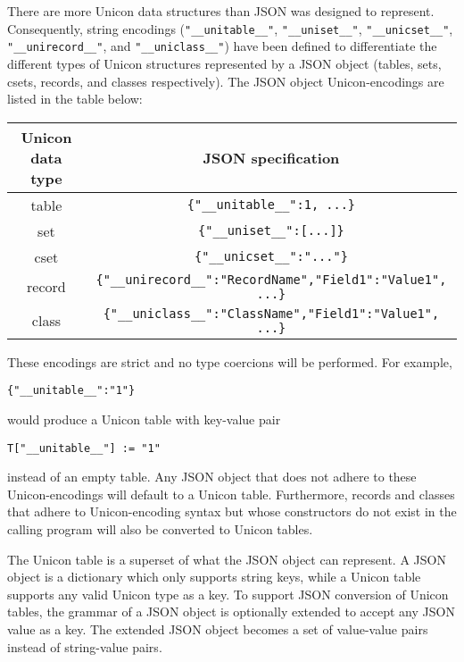 \documentclass[letterpaper,12pt]{article}
\begin{document}
There are more Unicon data structures than JSON was designed to represent.
Consequently, string encodings
(\texttt{"\_\_unitable\_\_"}, \texttt{"\_\_uniset\_\_"}, 
\texttt{"\_\_unicset\_\_"},
\texttt{"\_\_unirecord\_\_"}, and \texttt{"\_\_uniclass\_\_"})
have been defined 
to differentiate the different types of Unicon structures 
represented by a JSON object (tables, sets, csets, records, and classes 
respectively). The JSON object Unicon-encodings are listed in the table 
below:

\begin{center}
\end{center}

\begin{center}
\begin{tabular}{ c | c }
 Unicon	data type	& JSON specification\\
 \hline
 table	& \texttt{\{"\_\_unitable\_\_":1, ...\}} \\
 set	& \texttt{\{"\_\_uniset\_\_":[...]\}} \\
 cset	& \texttt{\{"\_\_unicset\_\_":"..."\}} \\
 record	& \texttt{\{"\_\_unirecord\_\_":"RecordName","Field1":"Value1", ...\}}\\
 class	& \texttt{\{"\_\_uniclass\_\_":"ClassName","Field1":"Value1", ...\}} \\

\end{tabular}
\end{center}

\noindent
These encodings are strict and no type coercions will be performed. 
For example,

\begin{verbatim}
{"__unitable__":"1"}
\end{verbatim}

\noindent
would produce a Unicon table with key-value pair

\begin{verbatim}
T["__unitable__"] := "1"
\end{verbatim}

\noindent
instead of an empty table. 
Any JSON object that does not adhere to these Unicon-encodings will default
to a Unicon table. Furthermore, records and classes that adhere to 
Unicon-encoding syntax but whose constructors do not exist in the calling 
program will also be converted to Unicon tables. 

The Unicon table is a superset of what the JSON object can represent. 
A JSON object is a dictionary which only supports string keys, while
a Unicon table supports any valid Unicon type as a key. To support
JSON conversion of Unicon tables, the grammar of a JSON object is optionally
extended to accept any JSON value as a key. The extended JSON object becomes 
a set of value-value pairs instead of string-value pairs.
\end{document}
